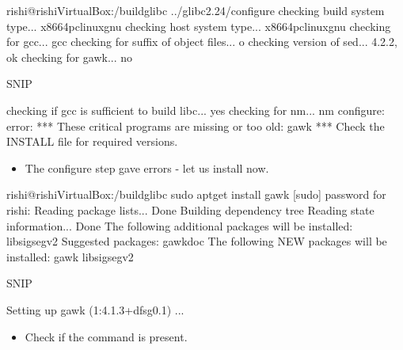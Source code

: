 \documentclass[letterpaper,10pt,english]{sphinxmanual}
\begin{document}
\begin{sphinxVerbatim}[commandchars=\\\{\}]
rishi@rishi\PYGZhy{}VirtualBox:\PYGZti{}/build\PYGZus{}glibc\PYGZdl{} ../glibc\PYGZhy{}2.24/configure
checking build system type... x86\PYGZus{}64\PYGZhy{}pc\PYGZhy{}linux\PYGZhy{}gnu
checking host system type... x86\PYGZus{}64\PYGZhy{}pc\PYGZhy{}linux\PYGZhy{}gnu
checking for gcc... gcc
checking for suffix of object files... o
checking version of sed... 4.2.2, ok
checking for gawk... no

\PYGZgt{}\PYGZgt{}\PYGZgt{}\PYGZgt{}\PYGZgt{}\PYGZgt{}\PYGZgt{}\PYGZgt{}\PYGZgt{}\PYGZgt{}\PYGZgt{}\PYGZgt{}\PYGZgt{}\PYGZgt{}\PYGZgt{}\PYGZgt{}\PYGZgt{}SNIP\PYGZlt{}\PYGZlt{}\PYGZlt{}\PYGZlt{}\PYGZlt{}\PYGZlt{}\PYGZlt{}\PYGZlt{}\PYGZlt{}\PYGZlt{}\PYGZlt{}\PYGZlt{}\PYGZlt{}\PYGZlt{}\PYGZlt{}\PYGZlt{}\PYGZlt{}\PYGZlt{}\PYGZlt{}\PYGZlt{}\PYGZlt{}\PYGZlt{}

checking if gcc is sufficient to build libc... yes
checking for nm... nm
configure: error:
*** These critical programs are missing or too old: gawk
*** Check the INSTALL file for required versions.
\end{sphinxVerbatim}
\begin{itemize}
\item {} 
The configure step gave errors - let us install  now.

\end{itemize}

\begin{sphinxVerbatim}[commandchars=\\\{\}]
rishi@rishi\PYGZhy{}VirtualBox:\PYGZti{}/build\PYGZus{}glibc\PYGZdl{} sudo apt\PYGZhy{}get install gawk
[sudo] password for rishi:
Reading package lists... Done
Building dependency tree
Reading state information... Done
The following additional packages will be installed:
libsigsegv2
Suggested packages:
gawk\PYGZhy{}doc
The following NEW packages will be installed:
gawk libsigsegv2

\PYGZgt{}\PYGZgt{}\PYGZgt{}\PYGZgt{}\PYGZgt{}\PYGZgt{}\PYGZgt{}\PYGZgt{}\PYGZgt{}\PYGZgt{}\PYGZgt{}\PYGZgt{}\PYGZgt{}SNIP\PYGZlt{}\PYGZlt{}\PYGZlt{}\PYGZlt{}\PYGZlt{}\PYGZlt{}\PYGZlt{}\PYGZlt{}\PYGZlt{}\PYGZlt{}\PYGZlt{}\PYGZlt{}\PYGZlt{}\PYGZlt{}

Setting up gawk (1:4.1.3+dfsg\PYGZhy{}0.1) ...
\end{sphinxVerbatim}
\begin{itemize}
\item {} 
Check if the command is present.

\end{itemize}
\end{document}
